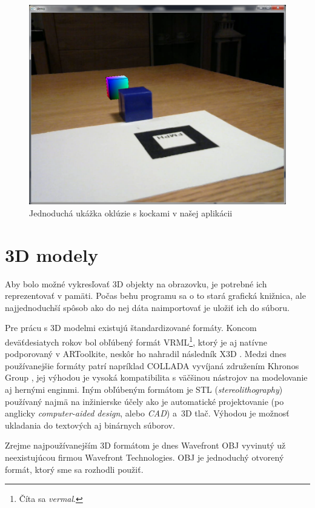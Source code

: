 \begin{figure}[h]
 \centering
 \includegraphics[max width=\textwidth]{pictures/screenshot-cubes.png}
 \caption{Jednoduchá ukážka oklúzie s kockami v našej aplikácii}
 \label{prototyp}
 \end{figure}

\section{3D modely}

Aby bolo možné vykresľovať 3D objekty na obrazovku, je potrebné ich reprezentovať v pamäti. Počas behu programu sa o to stará grafická knižnica, ale najjednoduchší spôsob ako do nej dáta naimportovať je uložiť ich do súboru.

Pre prácu s 3D modelmi existujú štandardizované formáty. Koncom deväťdesiatych rokov bol obľúbený formát VRML\footnote{Číta sa \emph{vermal}.}, ktorý je aj natívne podporovaný v ARToolkite, neskôr ho nahradil následník X3D \cite{Web3D}. Medzi dnes používanejšie formáty patrí napríklad COLLADA vyvíjaná združením Khronos Group \cite{Collada}, jej výhodou je vysoká kompatibilita s väčšinou nástrojov na modelovanie aj hernými enginmi. Iným obľúbeným formátom je STL (\emph{stereolithography}) používaný najmä na inžinierske účely ako je automatické projektovanie (po anglicky \emph{computer-aided design}, alebo \emph{CAD}) a~3D tlač. Výhodou je možnosť ukladania do textových aj binárnych súborov.

Zrejme najpoužívanejším 3D formátom je dnes Wavefront OBJ vyvinutý už neexistujúcou firmou Wavefront Technologies. OBJ je jednoduchý otvorený formát, ktorý sme sa rozhodli použiť.


